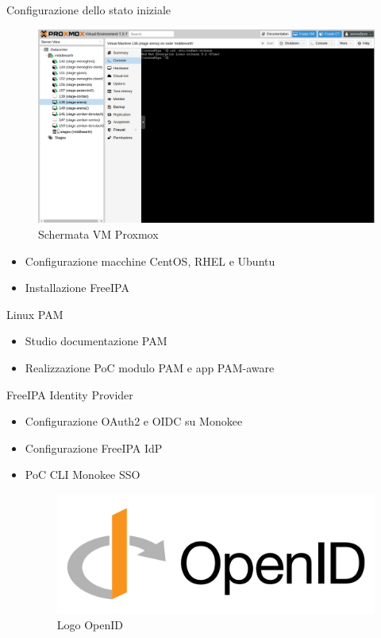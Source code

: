 \documentclass{beamer}
\begin{document}
	\begin{frame}{Configurazione dello stato iniziale}
		\begin{figure}[H] 
			\centering 
			\includegraphics[width=0.6\columnwidth]{immagini/proxmox.png} 
			\caption{Schermata VM Proxmox}
			\label{fig:proxmox}
		\end{figure}
		
		\begin{itemize}
			\item Configurazione macchine CentOS, RHEL e Ubuntu \vspace{.5em}
			\item Installazione FreeIPA \vspace{.5em}
		\end{itemize}
		
	\end{frame}
	
	\begin{frame}{Linux PAM}
				
		\begin{itemize}
			\item Studio documentazione PAM \vspace{.5em}
			\item Realizzazione PoC modulo PAM e app PAM-aware \vspace{.5em}
		\end{itemize}
		
	\end{frame}
	
	\begin{frame}{FreeIPA Identity Provider}
		
		\begin{itemize}
			\item Configurazione OAuth2 e OIDC su Monokee \vspace{.5em}
			\item Configurazione FreeIPA IdP \vspace{.5em}
			\item PoC CLI Monokee SSO \vspace{.5em}
			
			\begin{figure}[H] 
				\centering 
				\includegraphics[width=0.5\columnwidth]{immagini/oidc_logo.png} 
				\caption{Logo OpenID}
				\label{fig:oidc-setup}
			\end{figure}
		\end{itemize}
	\end{frame}
	
\end{document}
